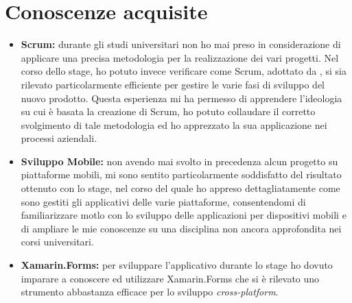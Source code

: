 \section{Conoscenze acquisite}
\begin{itemize}
	\item \textbf{Scrum:} durante gli studi universitari non ho mai preso in considerazione di applicare una precisa metodologia per la realizzazione dei vari progetti. Nel corso dello stage, ho potuto invece verificare come Scrum, adottato da \asi, si sia rilevato particolarmente efficiente per gestire le varie fasi di sviluppo del nuovo prodotto. Questa esperienza mi ha permesso di apprendere l'ideologia su cui è basata la creazione di Scrum, ho potuto collaudare il corretto svolgimento di tale metodologia ed ho apprezzato la sua applicazione nei processi aziendali.
	\item \textbf{Sviluppo Mobile:} non avendo mai svolto in precedenza alcun progetto su piattaforme mobili, mi sono sentito particolarmente soddisfatto del risultato ottenuto con lo stage, nel corso del quale ho appreso dettagliatamente come sono gestiti gli applicativi delle varie piattaforme, consentendomi di familiarizzare motlo con lo sviluppo delle applicazioni per dispositivi mobili e di ampliare le mie conoscenze su una disciplina non ancora approfondita nei corsi universitari.
	\item \textbf{Xamarin.Forms:} per sviluppare l'applicativo durante lo stage ho dovuto imparare a conoscere ed utilizzare Xamarin.Forms che si è rilevato uno strumento abbastanza efficace per lo sviluppo \textit{cross-platform}.
\end{itemize}